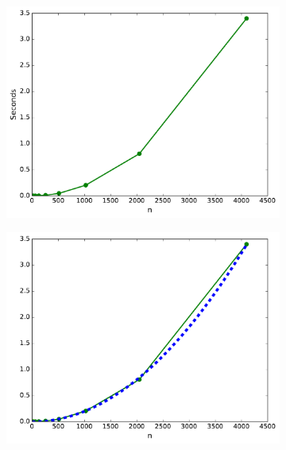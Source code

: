 \begin{figure}[H] %
\captionsetup[subfigure]{justification=centering}
\centering
\begin{subfigure}{.5\textwidth}
    \centering
    \includegraphics[width=\linewidth]{figures/time_random_matrix1.pdf}
\end{subfigure}%
\begin{subfigure}{.5\textwidth}
    \centering
    \includegraphics[width=\linewidth]{figures/time_random_matrix2.pdf}
\end{subfigure}
\end{figure}

